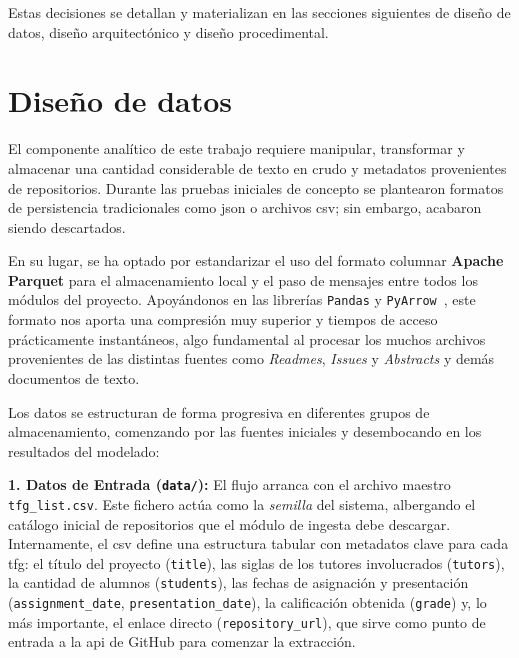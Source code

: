 Estas decisiones se detallan y materializan en las secciones siguientes de
diseño de datos, diseño arquitectónico y diseño procedimental.

\section{Diseño de datos}
El componente analítico de este trabajo requiere manipular, transformar y
almacenar una cantidad considerable de texto en crudo y metadatos provenientes
de repositorios. Durante las pruebas iniciales de concepto se plantearon
formatos de persistencia tradicionales como \acrshort{json} o archivos
\acrshort{csv}; sin embargo, acabaron siendo descartados.

En su lugar, se ha optado por estandarizar el uso del formato columnar
\textbf{Apache Parquet} para el almacenamiento local y el paso de mensajes
entre todos los módulos del proyecto. Apoyándonos en las librerías
\texttt{Pandas} y \texttt{PyArrow}~\cite{UserGuidePandas}, este formato nos
aporta una compresión muy superior y tiempos de acceso prácticamente
instantáneos, algo fundamental al procesar los muchos archivos provenientes de
las distintas fuentes como \textit{Readmes}, \textit{Issues} y
\textit{Abstracts} y demás documentos de texto.

Los datos se estructuran de forma progresiva en diferentes grupos de
almacenamiento, comenzando por las fuentes iniciales y desembocando en los
resultados del modelado:

\textbf{1. Datos de Entrada (\texttt{data/}):}
El flujo arranca con el archivo maestro \texttt{tfg\_list.csv}. Este fichero actúa como la \textit{semilla} del sistema, albergando el catálogo inicial de repositorios que el módulo de ingesta debe descargar. Internamente, el \acrshort{csv} define una estructura tabular con metadatos clave para cada \acrshort{tfg}: el título del proyecto (\texttt{title}), las siglas de los tutores involucrados (\texttt{tutors}), la cantidad de alumnos (\texttt{students}), las fechas de asignación y presentación (\texttt{assignment\_date}, \texttt{presentation\_date}), la calificación obtenida (\texttt{grade}) y, lo más importante, el enlace directo (\texttt{repository\_url}), que sirve como punto de entrada a la \acrshort{api} de GitHub para comenzar la extracción.

